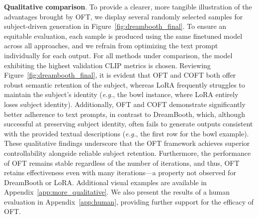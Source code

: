 \begin{itemize}[leftmargin=*,nosep]
\textbf{Qualitative comparison}. To provide a clearer, more tangible illustration of the advantages brought by OFT, we display several randomly selected samples for subject-driven generation in Figure~\ref{fig:dreambooth_final}. To ensure an equitable evaluation, each sample is produced using the same finetuned model across all approaches, and we refrain from optimizing the text prompt individually for each output. For all methods under comparison, the model exhibiting the highest validation CLIP metrics is chosen. Reviewing Figure~\ref{fig:dreambooth_final}, it is evident that OFT and COFT both offer robust semantic retention of the subject, whereas LoRA frequently struggles to maintain the subject’s identity (\emph{e.g.}, the bowl instance, where LoRA entirely loses subject identity). Additionally, OFT and COFT demonstrate significantly better adherence to text prompts, in contrast to DreamBooth, which, although successful at preserving subject identity, often fails to generate outputs consistent with the provided textual descriptions (\emph{e.g.}, the first row for the bowl example). These qualitative findings underscore that the OFT framework achieves superior controllability alongside reliable subject retention. Furthermore, the performance of OFT remains stable regardless of the number of iterations, and thus, OFT retains effectiveness even with many iterations—a property not observed for DreamBooth or LoRA. Additional visual examples are available in Appendix~\ref{app:more_qualitative}. We also present the results of a human evaluation in Appendix~\ref{app:human}, providing further support for the efficacy of OFT.


\end{itemize}
